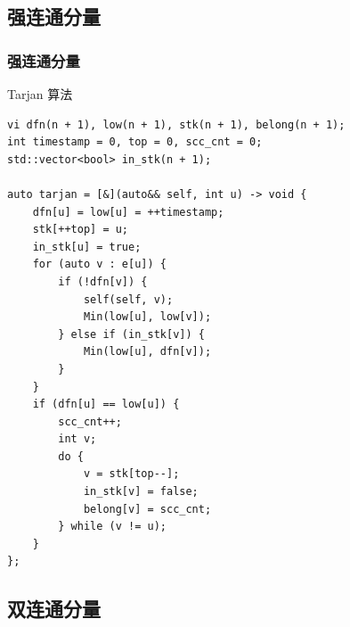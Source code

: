 \documentclass[UTF8, a4paper, titlepage, twoside]{ctexart}
\begin{document}
\subsection{ 强连通分量 }
\subsubsection{ 强连通分量 }
Tarjan 算法
\begin{lstlisting}[style=cpp]
vi dfn(n + 1), low(n + 1), stk(n + 1), belong(n + 1);
int timestamp = 0, top = 0, scc_cnt = 0;
std::vector<bool> in_stk(n + 1);

auto tarjan = [&](auto&& self, int u) -> void {
    dfn[u] = low[u] = ++timestamp;
    stk[++top] = u;
    in_stk[u] = true;
    for (auto v : e[u]) {
        if (!dfn[v]) {
            self(self, v);
            Min(low[u], low[v]);
        } else if (in_stk[v]) {
            Min(low[u], dfn[v]);
        }
    }
    if (dfn[u] == low[u]) {
        scc_cnt++;
        int v;
        do {
            v = stk[top--];
            in_stk[v] = false;
            belong[v] = scc_cnt;
        } while (v != u);
    }
};
\end{lstlisting}

\subsection{ 双连通分量 }
\end{document}
